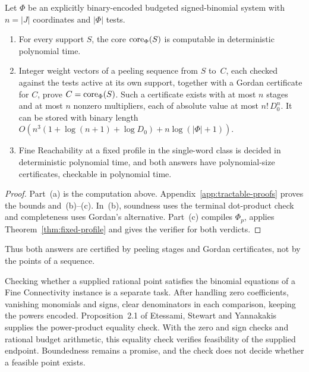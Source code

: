 \begin{theorem}\label{thm:certificates}
Let $\Phi$ be an explicitly binary-encoded budgeted signed-binomial system
with $n=|J|$ coordinates and $|\Phi|$
tests.
\begin{enumerate}
\item[(a)] For every support $S$, the core $\operatorname{core}_\Phi(S)$ is computable in
deterministic polynomial time.
\item[(b)] Integer weight vectors of a peeling sequence from $S$ to~$C$,
each checked against the tests active at its own support, together with a
Gordan certificate for $C$, prove $C=\operatorname{core}_\Phi(S)$. Such a certificate
exists with at most $n$ stages and at most $n$ nonzero multipliers, each
of absolute value at most $n!\,D_0^n$. It can be stored with binary length
$O(n^3(1+\log(n+1)+\log D_0)+n\log(|\Phi|+1))$.
\item[(c)] Fine Reachability at a fixed profile in the single-word class is
decided in deterministic polynomial time, and both answers have
polynomial-size certificates, checkable in polynomial time.
\end{enumerate}
\end{theorem}

\begin{proof}
Part~(a) is the computation above. Appendix~\ref{app:tractable-proofs}
proves the bounds and~(b)--(c). In~(b), soundness uses the terminal
dot-product check and completeness uses Gordan's alternative. Part~(c)
compiles $\Phi_p$, applies Theorem~\ref{thm:fixed-profile} and gives the
verifier for both verdicts.
\end{proof}

Thus both answers are certified by peeling stages and Gordan certificates,
not by the points of a sequence.

Checking whether a supplied rational point satisfies the binomial equations
of a Fine Connectivity instance is a separate task. After handling zero
coefficients, vanishing monomials and signs, clear denominators in each
comparison, keeping the powers encoded. Proposition~2.1 of Etessami,
Stewart and
Yannakakis~\cite[Proposition~2.1]{etessamistewartyannakakis} supplies the
power-product equality check. With the zero and sign checks and
rational budget arithmetic, this equality check verifies feasibility of the
supplied endpoint. Boundedness remains a promise, and the check does not
decide whether a feasible point exists.

